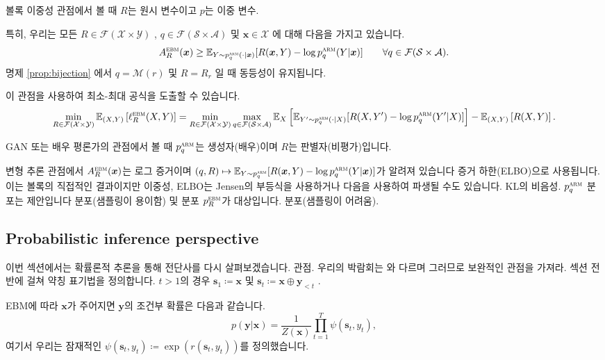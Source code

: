 \documentclass{article}
\def\s{{\bm{s}}}
\def\x{{\bm{x}}}
\def\y{{\bm{y}}}
\def\EE{{\mathbb{E}}}
\def\cA{{\mathcal{A}}}
\def\cF{{\mathcal{F}}}
\def\cM{{\mathcal{M}}}
\def\cS{{\mathcal{S}}}
\def\cX{{\mathcal{X}}}
\def\cY{{\mathcal{Y}}}
\newcommand{\Rsub}[1]{R_{#1}}
\def\arm{{\textsc{arm}}}
\def\ebm{{\textsc{ebm}}}
\begin{document}
볼록 이중성 관점에서 볼 때 $R$는 원시 변수이고 $p$는
이중 변수.

특히, 우리는 모든 $R \in \cF(\cX \times \cY)$ , $q \in \cF(\cS
\times \cA)$ 및 $\x \in \cX$ 에 대해 다음을 가지고 있습니다.
 \begin{equation} 
A^ \ebm _R( \x )
 \ge \EE _{Y \sim p^ \arm _q( \cdot | \x )}[R( \x , Y) - \log p^ \arm _q(Y| \x )] \qquad \forall q \in \cF ( \cS \times \cA ).
 \end{equation} 
명제 \ref{prop:bijection} 에서 $q = \cM(r)$ 및 $R =
\Rsub{r}$ 일 때 동등성이 유지됩니다.

이 관점을 사용하여 최소-최대 공식을 도출할 수 있습니다.
 \begin{equation} 
 \min _{R \in \cF ( \cX \times \cY )} \EE _{(X, Y)} \left [ \ell ^ \ebm _R(X, Y) \right ]
= 
 \min _{R \in \cF ( \cX \times \cY )}
 \max _{q \in \cF ( \cS \times \cA )}
 \EE _X \left [ \EE _{Y' \sim p^ \arm _q( \cdot |X)}[R(X, Y') - \log p^ \arm _q(Y'|X)] \right ] - \EE _{(X,Y)} \left [R(X, Y) \right ].
 \end{equation}

GAN 또는 배우 평론가의 관점에서 볼 때 $p_q^\arm$는 생성자(배우)이며
 $R$는 판별자(비평가)입니다.

변형 추론 관점에서 $A^\ebm_R(\x)$는 로그 증거이며
 $(q, R) \mapsto \EE_{Y \sim p^\arm_q}[R(\x, Y) - \log p^\arm_q(Y|\x)]$가 알려져 있습니다
증거 하한(ELBO)으로 사용됩니다.  이는 볼록의 직접적인 결과이지만
이중성, ELBO는 Jensen의 부등식을 사용하거나 다음을 사용하여 파생될 수도 있습니다.
KL의 비음성.  $p^\arm_q$ 분포는 제안입니다
분포(샘플링이 용이함) 및 분포 $p^\ebm_R$가 대상입니다.
분포(샘플링이 어려움).

\subsection{Probabilistic inference perspective} 
 \label{sec:proba_inference_perspective}

이번 섹션에서는 확률론적 추론을 통해 전단사를 다시 살펴보겠습니다.
관점. 우리의 박람회는 \citep{levine2018reinforcement}와 다르며
그러므로 보완적인 관점을 가져라.
섹션 전반에 걸쳐 약칭 표기법을 정의합니다. 
 $t > 1$의 경우 $\s_1 \coloneqq \x$ 및 $\s_t \coloneqq \x \oplus \y_{<t}$ .

EBM에 따라 $\x$가 주어지면 $\y$의 조건부 확률은 다음과 같습니다.
 \begin{equation} 
p( \y | \x ) = \frac{1} {Z( \x )} \prod _{t=1}^T \psi ( \s _t, y_t),
 \end{equation} 
여기서 우리는 잠재적인 $\psi(\s_t, y_t) \coloneqq \exp(r(\s_t, y_t))$를 정의했습니다.
\end{document}
